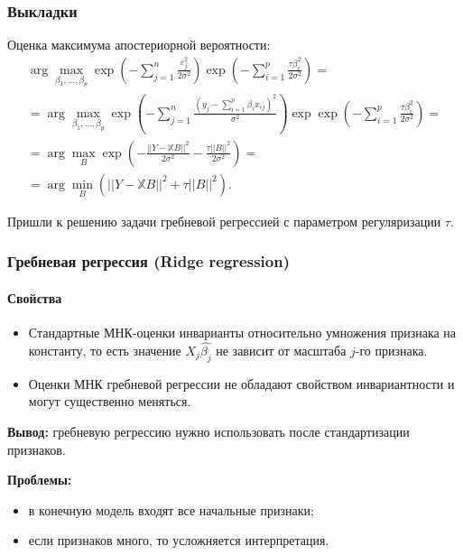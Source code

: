 \documentclass[10pt,unicode, notheorems]{beamer}
\begin{document}
\begin{frame}
\frametitle{Выкладки}
Оценка максимума апостериорной вероятности:
\begin{multline*}
\arg\max_{\beta_{1},\ldots,\beta_{p}}\exp
\left(
-\sum_{j=1}^{n}
\frac{\varepsilon_{j}^{2}}{2\sigma^{2}}
\right)
\exp\left(
-\sum_{i=1}^{p}
\frac{\tau\beta_{i}^{2}}{2\sigma^{2}}\right)
=\\=
\arg\max_{\beta_{1},\ldots,\beta_{p}}\exp
\left(-\sum_{j=1}^{n}
\frac{(y_{j}-\sum_{i=1}^{p}\beta_{i}x_{ij})^{2}}{\sigma^{2}}
\right)
\exp
\exp\left(
-\sum_{i=1}^{p}
\frac{\tau\beta_{i}^{2}}{2\sigma^{2}}\right)
=\\=
\arg\max_{B}
\exp
\left(
-\frac{||Y-\mathbb{X}B||^{2}}{2\sigma^{2}}-\frac{\tau||B||^{2}}{2\sigma^{2}}
\right)
=\\=
\arg\min_{B}
(||Y-\mathbb{X}B||^{2}+\tau||B||^{2}).
\end{multline*}

Пришли к решению задачи гребневой регрессией с параметром регуляризации $\tau$.
\end{frame}

\begin{frame}
\frametitle{Гребневая регрессия (Ridge regression)}
\framesubtitle{Свойства}
\begin{itemize}
\item Стандартные МНК-оценки инварианты относительно умножения признака на константу, то есть значение $X_{j}\hat{\beta_j}$ не зависит от масштаба $j$-го признака. 
\item Оценки МНК гребневой регрессии не обладают свойством инвариантности и могут существенно меняться.
\end{itemize}

\vspace{0.3cm}
\textbf{Вывод:} гребневую регрессию нужно использовать после стандартизации признаков.
\vspace{0.8cm}

\textbf{Проблемы:} 
\begin{itemize}
\item в конечную модель входят все начальные признаки;
\item если признаков много, то усложняется интерпретация.
\end{itemize}

\end{frame}
\end{document}

